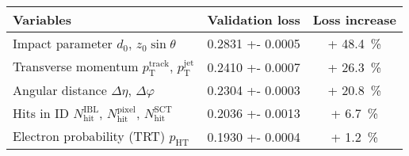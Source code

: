 \begin{tabular}{p{5cm}S[table-format=1.4(4)]S[retain-explicit-plus, table-format=+2.1]}
  \toprule
  {Variables} & {Validation loss} & {Loss increase} \\
  \midrule
  \parbox[c]{\hsize}{Impact parameter \newline $d_0$, $z_0 \sin\theta$}
          & 0.2831 +- 0.0005 & + 48.4 \,\si{\percent} \\[1.2em]
  \parbox[c]{\hsize}{Transverse momentum \newline $p_\text{T}^\text{track}$, $p_\text{T}^\text{jet}$}
          & 0.2410 +- 0.0007 & + 26.3 \,\si{\percent} \\[1.2em]
  \parbox[c]{\hsize}{Angular distance \newline $\Delta \eta$, $\Delta \varphi$}
          & 0.2304 +- 0.0003 & + 20.8 \,\si{\percent} \\[1.2em]
  \parbox[c]{\hsize}{Hits in ID \newline $N_\text{hit}^\text{IBL}$, $N_\text{hit}^\text{pixel}$, $N_\text{hit}^\text{SCT}$}
          & 0.2036 +- 0.0013 & + 6.7 \,\si{\percent} \\[1.2em]
  \parbox[c]{\hsize}{Electron probability (TRT) \newline $p_\text{HT}$}
          & 0.1930 +- 0.0004 & + 1.2 \,\si{\percent}\\
  \bottomrule
\end{tabular}

